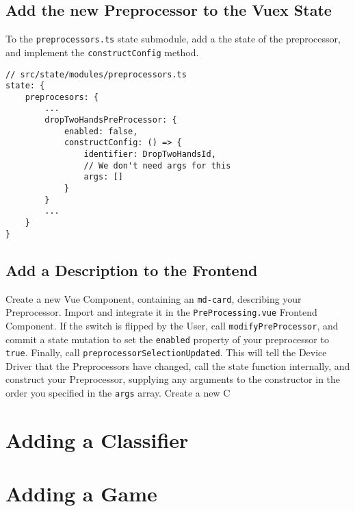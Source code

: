 \subsection{Add the new Preprocessor to the Vuex State}
To the \texttt{preprocessors.ts} state submodule, add a the state of the preprocessor, and implement the \texttt{constructConfig} method.
\begin{verbatim}
// src/state/modules/preprocessors.ts
state: {
    preprocesors: {
        ...
        dropTwoHandsPreProcessor: {
            enabled: false,
            constructConfig: () => {
                identifier: DropTwoHandsId,
                // We don't need args for this
                args: []
            }
        }
        ...
    }
}
\end{verbatim}
\subsection{Add a Description to the Frontend}
Create a new Vue Component, containing an \texttt{md-card}, describing your Preprocessor. Import and integrate it in the \texttt{PreProcessing.vue} Frontend Component. If the switch is flipped by the User, call \texttt{modifyPreProcessor}, and commit a state mutation to set the \texttt{enabled} property of your preprocessor to \texttt{true}. Finally, call \texttt{preprocessorSelectionUpdated}. This will tell the Device Driver that the Preprocessors have changed, call the state function  internally, and construct your Preprocessor, supplying any arguments to the constructor in the order you specified in the \texttt{args} array.
Create a new C
\section{Adding a Classifier}
\section{Adding a Game}
